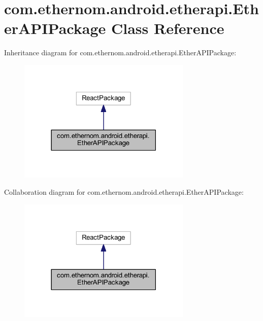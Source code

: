 \hypertarget{classcom_1_1ethernom_1_1android_1_1etherapi_1_1_ether_a_p_i_package}{}\section{com.\+ethernom.\+android.\+etherapi.\+Ether\+A\+P\+I\+Package Class Reference}
\label{classcom_1_1ethernom_1_1android_1_1etherapi_1_1_ether_a_p_i_package}


Inheritance diagram for com.\+ethernom.\+android.\+etherapi.\+Ether\+A\+P\+I\+Package\+:\nopagebreak
\begin{figure}[H]
\begin{center}
\leavevmode
\includegraphics[width=234pt]{classcom_1_1ethernom_1_1android_1_1etherapi_1_1_ether_a_p_i_package__inherit__graph}
\end{center}
\end{figure}


Collaboration diagram for com.\+ethernom.\+android.\+etherapi.\+Ether\+A\+P\+I\+Package\+:\nopagebreak
\begin{figure}[H]
\begin{center}
\leavevmode
\includegraphics[width=234pt]{classcom_1_1ethernom_1_1android_1_1etherapi_1_1_ether_a_p_i_package__coll__graph}
\end{center}
\end{figure}
